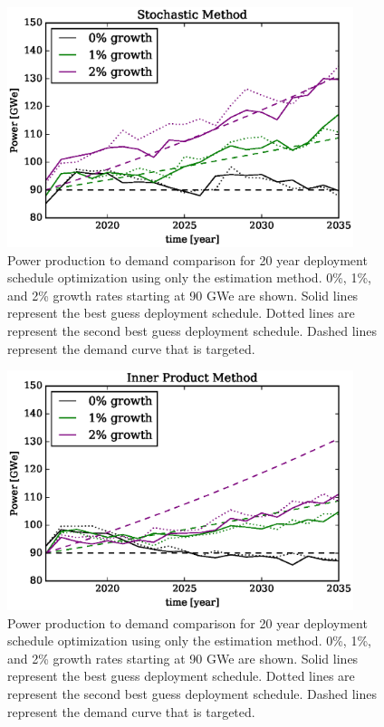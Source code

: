 \begin{figure}[htb]
\centering
\includegraphics[width=0.9\textwidth]{demand-product-stochastic.eps}
\caption{Power production to demand comparison for 20 year deployment
schedule optimization using only the \stochastic estimation method.
0\%, 1\%, and 2\% growth rates starting at 90 GWe are shown. Solid lines
represent the best guess deployment schedule.  Dotted lines are represent
the second best guess deployment schedule. Dashed lines represent the
demand curve that is targeted.
}
\label{demand-product-stochastic}
\end{figure}

\begin{figure}[htb]
\centering
\includegraphics[width=0.9\textwidth]{demand-product-inner-product.eps}
\caption{Power production to demand comparison for 20 year deployment
schedule optimization using only the \innerprod estimation method.
0\%, 1\%, and 2\% growth rates starting at 90 GWe are shown. Solid lines
represent the best guess deployment schedule.  Dotted lines are represent
the second best guess deployment schedule. Dashed lines represent the
demand curve that is targeted.
}
\label{demand-product-inner-product}
\end{figure}

